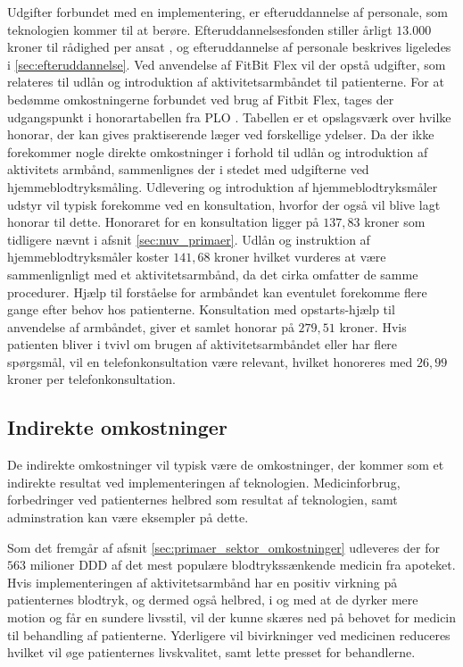 Udgifter forbundet med en implementering, er efteruddannelse af personale, som teknologien kommer til at berøre. Efteruddannelsesfonden stiller årligt $13.000$ kroner til rådighed per ansat \citep{vedsted2005}, og efteruddannelse af personale beskrives ligeledes i \autoref{sec:efteruddannelse}.   
Ved anvendelse af FitBit Flex vil der opstå udgifter, som relateres til udlån og introduktion af aktivitetsarmbåndet til patienterne. For at bedømme omkostningerne forbundet ved brug af Fitbit Flex, tages der udgangspunkt i honorartabellen fra PLO \citep{honorartabel2016}. Tabellen er et opslagsværk over hvilke honorar, der kan gives praktiserende læger ved forskellige ydelser.
Da der ikke forekommer nogle direkte omkostninger i forhold til udlån og introduktion af aktivitets armbånd, sammenlignes der i stedet med udgifterne ved hjemmeblodtryksmåling. Udlevering og introduktion af hjemmeblodtryksmåler udstyr vil typisk forekomme ved en konsultation, hvorfor der også vil blive lagt honorar til dette. Honoraret for en konsultation ligger på $137,83$ kroner som tidligere nævnt i afsnit \autoref{sec:nuv_primaer}. Udlån og instruktion af hjemmeblodtryksmåler koster $141,68$ kroner hvilket vurderes at være sammenlignligt med et aktivitetsarmbånd, da det cirka omfatter de samme procedurer. Hjælp til forståelse for armbåndet kan eventulet forekomme flere gange efter behov hos patienterne. Konsultation med opstarts-hjælp til anvendelse af armbåndet, giver et samlet honorar på $279,51$ kroner. Hvis patienten bliver i tvivl om brugen af aktivitetsarmbåndet eller har flere spørgsmål, vil en telefonkonsultation være relevant, hvilket honoreres med $26,99$ kroner per telefonkonsultation.

\subsection{Indirekte omkostninger}

De indirekte omkostninger vil typisk være de omkostninger, der kommer som et indirekte resultat ved implementeringen af teknologien. Medicinforbrug, forbedringer ved patienternes helbred som resultat af teknologien, samt adminstration kan være eksempler på dette. 

Som det fremgår af afsnit \autoref{sec:primaer_sektor_omkostninger} udleveres der for $563$ milioner DDD af det mest populære blodtrykssænkende medicin fra apoteket. Hvis implementeringen af aktivitetsarmbånd har en positiv virkning på patienternes blodtryk, og dermed også helbred, i og med at de dyrker mere motion og får en sundere livsstil, vil der kunne skæres ned på behovet for medicin til behandling af patienterne. Yderligere vil bivirkninger ved medicinen reduceres hvilket vil øge patienternes livskvalitet, samt lette presset for behandlerne. 

